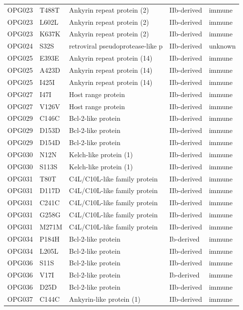 \documentclass[11pt]{article}
\begin{document}
\begin{longtable}{lllll}
OPG023 & T488T & Ankyrin repeat protein (2) & IIb-derived & immune \\
OPG023 & L602L & Ankyrin repeat protein (2) & IIb-derived & immune \\
OPG023 & K637K & Ankyrin repeat protein (2) & IIb-derived & immune \\
OPG024 & S32S & retroviral pseudoprotease-like p & IIb-derived & unknown \\
OPG025 & E393E & Ankyrin repeat protein (14) & IIb-derived & immune \\
OPG025 & A423D & Ankyrin repeat protein (14) & IIb-derived & immune \\
OPG025 & I425I & Ankyrin repeat protein (14) & IIb-derived & immune \\
OPG027 & I47I & Host range protein & IIb-derived & immune \\
OPG027 & V126V & Host range protein & IIb-derived & immune \\
OPG029 & C146C & Bcl-2-like protein & IIb-derived & immune \\
OPG029 & D153D & Bcl-2-like protein & IIb-derived & immune \\
OPG029 & D154D & Bcl-2-like protein & IIb-derived & immune \\
OPG030 & N12N & Kelch-like protein (1) & IIb-derived & immune \\
OPG030 & S113S & Kelch-like protein (1) & IIb-derived & immune \\
OPG031 & T80T & C4L/C10L-like family protein & IIb-derived & immune \\
OPG031 & D117D & C4L/C10L-like family protein & IIb-derived & immune \\
OPG031 & C241C & C4L/C10L-like family protein & IIb-derived & immune \\
OPG031 & G258G & C4L/C10L-like family protein & IIb-derived & immune \\
OPG031 & M271M & C4L/C10L-like family protein & IIb-derived & immune \\
OPG034 & P184H & Bcl-2-like protein & Ib-derived & immune \\
OPG034 & L205L & Bcl-2-like protein & IIb-derived & immune \\
OPG036 & S11S & Bcl-2-like protein & IIb-derived & immune \\
OPG036 & V17I & Bcl-2-like protein & Ib-derived & immune \\
OPG036 & D25D & Bcl-2-like protein & IIb-derived & immune \\
OPG037 & C144C & Ankyrin-like protein (1) & IIb-derived & immune \\

\end{longtable}
\end{document}
